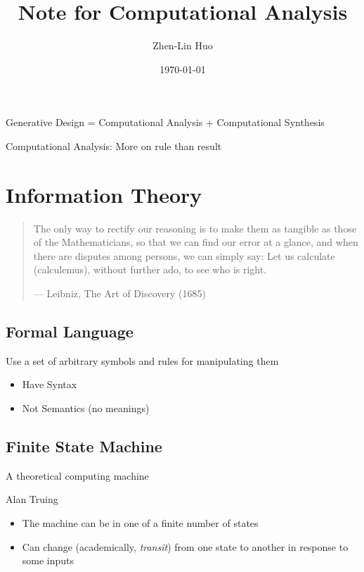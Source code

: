 \documentclass[a4paper, openany]{book}
\title{Note for Computational Analysis}
\author{Zhen-Lin Huo}
\date{\today}
\begin{document}
\maketitle
\frontmatter
\tableofcontents

\mainmatter

Generative Design = Computational Analysis + Computational Synthesis

Computational Analysis: More on rule than result

\chapter{Information Theory}

\begin{quote}
The only way to rectify our reasoning is to make them as tangible as those of the Mathematicians, so that we can find our error at a glance, and when there are disputes among persons, we can simply say: Let us calculate (calculemus), without further ado, to see who is right.
  \begin{flushright}
    --- Leibniz, The Art of Discovery (1685)
  \end{flushright}
\end{quote}

\section{Formal Language}

Use a set of arbitrary symbols and rules for manipulating them

\begin{itemize}
  \item Have Syntax
  \item Not Semantics (no meanings)
\end{itemize}

\section{Finite State Machine}

A theoretical computing machine

Alan Truing

\begin{itemize}
  \item The machine can be in one of a finite number of states
  \item Can change (academically, \emph{transit}) from one state to another in
  response to some inputs
\end{itemize}
\end{document}
